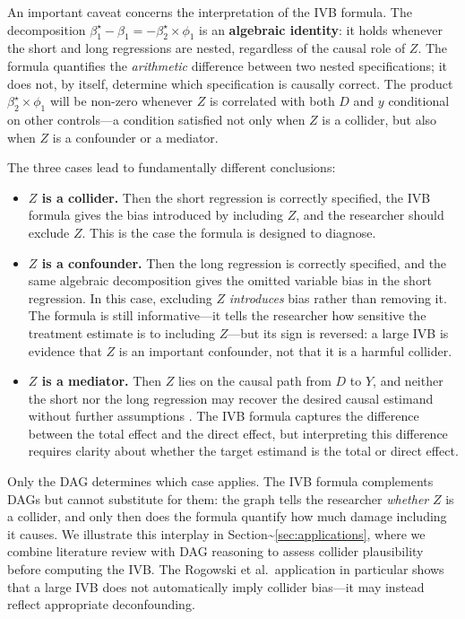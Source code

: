 \documentclass[
]{article}
\begin{document}
An important caveat concerns the interpretation of the IVB formula. The
decomposition
\(\beta_1^{\star} - \beta_1 = -\beta_2^{\star} \times \phi_1\) is an
\textbf{algebraic identity}: it holds whenever the short and long
regressions are nested, regardless of the causal role of \(Z\). The
formula quantifies the \textit{arithmetic} difference between two nested
specifications; it does not, by itself, determine which specification is
causally correct. The product \(\beta_2^{\star} \times \phi_1\) will be
non-zero whenever \(Z\) is correlated with both \(D\) and \(y\)
conditional on other controls---a condition satisfied not only when
\(Z\) is a collider, but also when \(Z\) is a confounder or a mediator.

The three cases lead to fundamentally different conclusions:

\begin{itemize}
\item \textbf{$Z$ is a collider.} Then the short regression is correctly specified, the IVB formula gives the bias introduced by including $Z$, and the researcher should exclude $Z$. This is the case the formula is designed to diagnose.

\item \textbf{$Z$ is a confounder.} Then the long regression is correctly specified, and the same algebraic decomposition gives the omitted variable bias in the short regression. In this case, excluding $Z$ \textit{introduces} bias rather than removing it. The formula is still informative---it tells the researcher how sensitive the treatment estimate is to including $Z$---but its sign is reversed: a large IVB is evidence that $Z$ is an important confounder, not that it is a harmful collider.

\item \textbf{$Z$ is a mediator.} Then $Z$ lies on the causal path from $D$ to $Y$, and neither the short nor the long regression may recover the desired causal estimand without further assumptions \citep{acharya_etal2016}. The IVB formula captures the difference between the total effect and the direct effect, but interpreting this difference requires clarity about whether the target estimand is the total or direct effect.
\end{itemize}

Only the DAG determines which case applies. The IVB formula complements
DAGs but cannot substitute for them: the graph tells the researcher
\textit{whether} \(Z\) is a collider, and only then does the formula
quantify how much damage including it causes. We illustrate this
interplay in Section\textasciitilde{}\ref{sec:applications}, where we
combine literature review with DAG reasoning to assess collider
plausibility before computing the IVB. The Rogowski et al.~application
in particular shows that a large IVB does not automatically imply
collider bias---it may instead reflect appropriate deconfounding.
\end{document}

